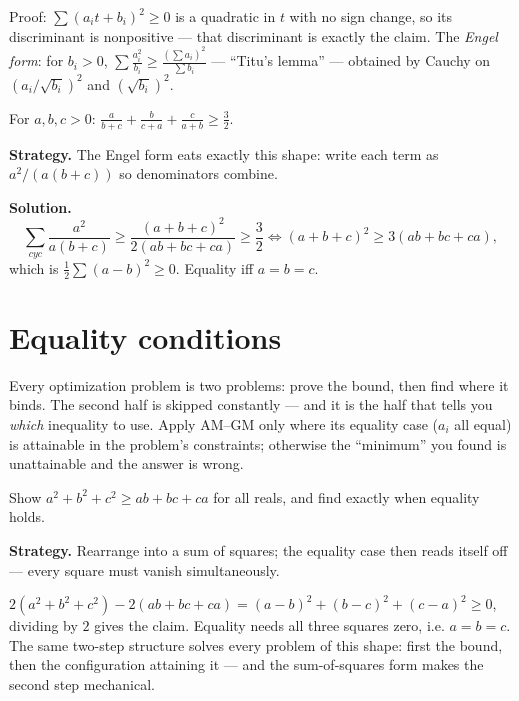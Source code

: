 Proof: $\sum (a_i t + b_i)^2 \ge 0$ is a quadratic in $t$ with no sign
change, so its discriminant is nonpositive --- that discriminant is
exactly the claim. The \emph{Engel form}: for $b_i>0$,
$\sum \frac{a_i^2}{b_i} \ge \frac{(\sum a_i)^2}{\sum b_i}$ --- ``Titu's
lemma'' --- obtained by Cauchy on $(a_i/\sqrt{b_i})^2$ and
$(\sqrt{b_i})^2$.

\begin{example}
For $a,b,c>0$: $\frac{a}{b+c}+\frac{b}{c+a}+\frac{c}{a+b}\ge\frac32$.

\textbf{Strategy.} The Engel form eats exactly this shape: write each
term as $a^2/(a(b+c))$ so denominators combine.

\textbf{Solution.}
\[
\sum_{cyc}\frac{a^2}{a(b+c)} \ge
\frac{(a+b+c)^2}{2(ab+bc+ca)} \ge \frac32
\iff (a+b+c)^2 \ge 3(ab+bc+ca),
\]
which is $\frac12\sum(a-b)^2\ge0$. Equality iff $a=b=c$.
\end{example}

\section{Equality conditions}

Every optimization problem is two problems: prove the bound, then find
where it binds. The second half is skipped constantly --- and it is the
half that tells you \emph{which} inequality to use. Apply AM--GM only
where its equality case ($a_i$ all equal) is attainable in the problem's
constraints; otherwise the ``minimum'' you found is unattainable and the
answer is wrong.

\begin{example}
Show $a^2 + b^2 + c^2 \ge ab + bc + ca$ for all reals, and find exactly
when equality holds.
\par\smallskip
\textbf{Strategy.} Rearrange into a sum of squares; the equality case
then reads itself off --- every square must vanish simultaneously.
\par\smallskip
\begin{solution}
$2(a^2+b^2+c^2) - 2(ab+bc+ca) = (a-b)^2 + (b-c)^2 + (c-a)^2 \ge 0$,
dividing by $2$ gives the claim. Equality needs all three squares zero,
i.e. $a = b = c$. The same two-step structure solves every problem of
this shape: first the bound, then the configuration attaining it ---
and the sum-of-squares form makes the second step mechanical.
\end{solution}
\end{example}

